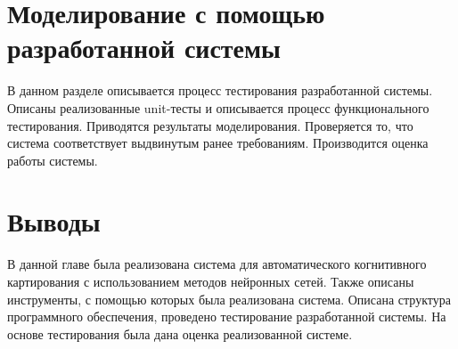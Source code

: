\section{Моделирование с помощью разработанной системы}
\begin{annotation}
	В данном разделе описывается процесс тестирования разработанной системы.
	Описаны реализованные unit-тесты и описывается процесс функционального тестирования.
	Приводятся результаты моделирования. Проверяется то, что система соответствует выдвинутым ранее требованиям.
	Производится оценка работы системы.
\end{annotation}

\section{Выводы}

В данной главе была реализована система для автоматического когнитивного картирования с использованием
методов нейронных сетей.
Также описаны инструменты, с помощью которых была реализована система.
Описана структура программного обеспечения, проведено тестирование разработанной системы.
На основе тестирования была дана оценка реализованной системе.


